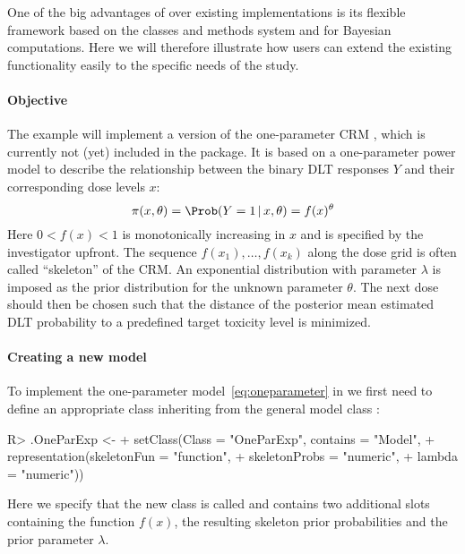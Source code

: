 \documentclass[article]{jss}\usepackage[]{graphicx}\usepackage[]{color}
\newcommand{\given}{\,\vert\,}
\begin{document}
One of the big advantages of  over existing  implementations is its flexible
framework based on the  classes and methods system \citep{Chambers2008} and  \citep{JAGS}
for Bayesian computations. Here we will therefore illustrate how users can extend 
the existing functionality easily to the specific needs of the study.

\paragraph{Objective} 
The example will implement a version of the one-parameter CRM 
\citep{oquigley1990}, which is currently not (yet) included in the package.
It is based on a one-parameter power model to describe the relationship between the binary DLT responses $Y$ and their corresponding dose levels $x$:
\begin{equation}
\label{eq:oneparameter}
\pi(x, \theta) = \Prob(Y=1 \given x, \theta) = f(x)^{\theta}
\end{equation}
Here $0 < f(x) < 1$ is monotonically increasing in $x$ and is specified by the
investigator upfront. The sequence $f(x_{1}), \dotsc, f(x_{k})$ along the
dose grid is often called ``skeleton'' of the CRM. An exponential distribution with parameter $\lambda$ is imposed as the prior distribution for the unknown parameter $\theta$. 
The next dose should then be chosen such that the distance of the posterior mean estimated DLT probability to a predefined target toxicity level is minimized.  

\paragraph{Creating a new model} 
To implement the one-parameter model~\eqref{eq:oneparameter} in  we first need to define an appropriate  class inheriting from the general model class :
\begin{Schunk}
\begin{Sinput}
R> .OneParExp <-
+      setClass(Class = "OneParExp", contains = "Model",
+               representation(skeletonFun = "function", 
+                              skeletonProbs = "numeric", 
+                              lambda = "numeric"))
\end{Sinput}
\end{Schunk}
Here we specify that the new class is called  and contains
two additional slots containing the function $f(x)$, the resulting skeleton
prior probabilities and the prior parameter $\lambda$. 
\end{document}

